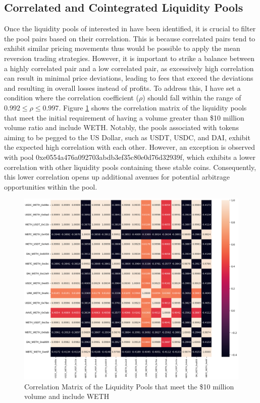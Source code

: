 \subsection{Correlated and Cointegrated Liquidity Pools}
Once the liquidity pools of interested in have been identified, it is crucial to filter the pool pairs based on their correlation. This is because correlated pairs tend to exhibit similar pricing movements thus would be possible to apply the mean reversion trading strategies. However, it is important to strike a balance between a highly correlated pair and a low correlated pair, as excessively high correlation can result in minimal price deviations, leading to fees that exceed the deviations and resulting in overall losses instead of profits. To address this, I have set a condition where the correlation coefficient ($\rho$) should fall within the range of $0.992 \leq \rho \leq 0.997$. Figure \ref{fig:correlationMatrix} shows the correlation matrix of the liquidity pools that meet the initial requirement of having a volume greater than \$10 million volume ratio and include WETH. Notably, the pools associated with tokens aiming to be pegged to the US Dollar, such as USDT, USDC, and DAI, exhibit the expected high correlation with each other. However, an exception is observed with pool 0xe0554a476a092703abdb3ef35c80e0d76d32939f, which exhibits a lower correlation with other liquidity pools containing these stable coins. Consequently, this lower correlation opens up additional avenues for potential arbitrage opportunities within the pool.
\begin{figure}[!htb]
    \centering
    \includegraphics[width=\textwidth]{project/Images/correlationMatrix.png}
    \caption{Correlation Matrix of the Liquidity Pools that meet the \$10 million volume and include WETH \label{fig:correlationMatrix}}
\end{figure}
